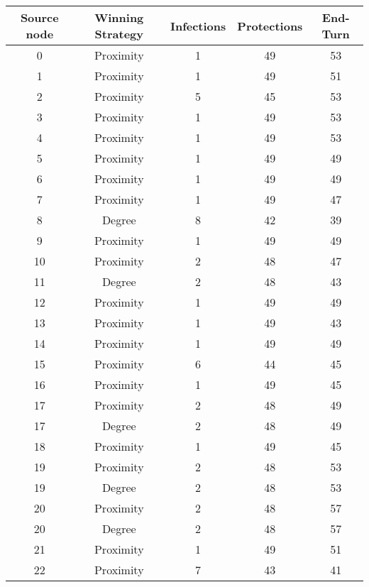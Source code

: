 \documentclass[results.tex]{subfiles}
\begin{document}
\begin{center}
  \begin{tabular}{| c || c | c | c | c |}
    \hline
    {\bfseries Source node} & {\bfseries Winning Strategy} & {\bfseries Infections} & {\bfseries Protections} & {\bfseries End-Turn} \\  %
    \hline\hline
    0 & Proximity & 1 & 49 & 53 \\ 
    \hline
    1 & Proximity & 1 & 49 & 51 \\ 
    \hline
    2 & Proximity & 5 & 45 & 53 \\ 
    \hline
    3 & Proximity & 1 & 49 & 53 \\ 
    \hline
    4 & Proximity & 1 & 49 & 53 \\ 
    \hline
    5 & Proximity & 1 & 49 & 49 \\ 
    \hline
    6 & Proximity & 1 & 49 & 49 \\ 
    \hline
    7 & Proximity & 1 & 49 & 47 \\ 
    \hline
    8 & Degree & 8 & 42 & 39 \\ 
    \hline
    9 & Proximity & 1 & 49 & 49 \\ 
    \hline
    10 & Proximity & 2 & 48 & 47 \\ 
    \hline
    11 & Degree & 2 & 48 & 43 \\ 
    \hline
    12 & Proximity & 1 & 49 & 49 \\ 
    \hline
    13 & Proximity & 1 & 49 & 43 \\ 
    \hline
    14 & Proximity & 1 & 49 & 49 \\ 
    \hline
    15 & Proximity & 6 & 44 & 45 \\ 
    \hline
    16 & Proximity & 1 & 49 & 45 \\ 
    \hline
    17 & Proximity & 2 & 48 & 49 \\ 
    \hline
    17 & Degree & 2 & 48 & 49 \\ 
    \hline
    18 & Proximity & 1 & 49 & 45 \\ 
    \hline
    19 & Proximity & 2 & 48 & 53 \\ 
    \hline
    19 & Degree & 2 & 48 & 53 \\ 
    \hline
    20 & Proximity & 2 & 48 & 57 \\ 
    \hline
    20 & Degree & 2 & 48 & 57 \\ 
    \hline
    21 & Proximity & 1 & 49 & 51 \\ 
    \hline
    22 & Proximity & 7 & 43 & 41 \\ 

\end{tabular}
\end{center}
\end{document}
